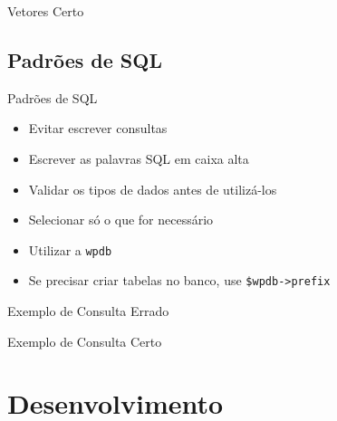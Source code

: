 \documentclass{beamer}
\begin{document}
\begin{frame}{Vetores}
  Certo
  
\end{frame}

\subsection{Padrões de SQL}

\begin{frame}{Padrões de SQL}
\begin{itemize}
  \pause \item Evitar escrever consultas
  \pause \item Escrever as palavras SQL em caixa alta
  \pause \item Validar os tipos de dados antes de utilizá-los
  \pause \item Selecionar só o que for necessário
  \pause \item Utilizar a \texttt{wpdb}
  \pause \item Se precisar criar tabelas no banco, use \texttt{\$wpdb->prefix}
\end{itemize}
\end{frame}

\begin{frame}{Exemplo de Consulta}
  Errado
  
\end{frame}

\begin{frame}{Exemplo de Consulta}
  Certo
  
\end{frame}

\section{Desenvolvimento}

\begin{frame}\end{frame}
\end{document}
